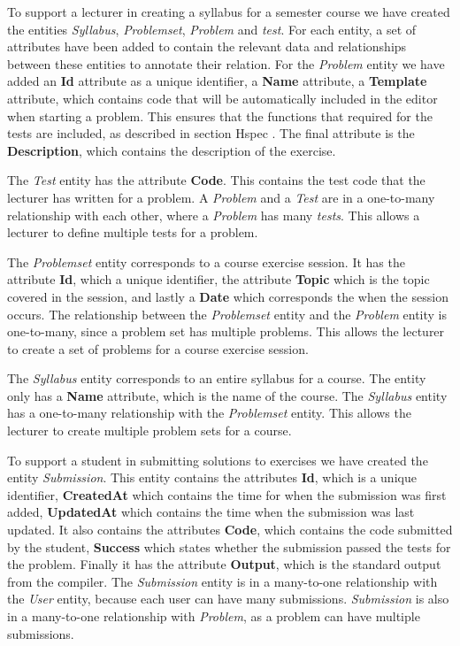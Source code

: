 To support a lecturer in creating a syllabus for a semester course we have created the entities \textit{Syllabus}, \textit{Problemset}, \textit{Problem} and \textit{test}. For each entity, a set of attributes have been added to contain the relevant data and relationships between these entities to annotate their relation.
For the \textit{Problem} entity we have added an \textbf{Id} attribute as a unique identifier, a \textbf{Name} attribute, a \textbf{Template} attribute, which contains code that will be automatically included in the editor when starting a problem. This ensures that the functions that required for the tests are included, as described in section Hspec . The final attribute is the \textbf{Description}, which contains the description of the exercise.

The \textit{Test} entity has the attribute \textbf{Code}. This contains the test code that the lecturer has written for a problem. A \textit{Problem} and a \textit{Test} are in a one-to-many relationship with each other, where a \textit{Problem} has many \textit{tests}. This allows a lecturer to define multiple tests for a problem.

The \textit{Problemset} entity corresponds to a course exercise session. It has the attribute \textbf{Id}, which a unique identifier, the attribute \textbf{Topic} which is the topic covered in the session, and lastly a \textbf{Date} which corresponds the when the session occurs. The relationship between the \textit{Problemset} entity and the \textit{Problem} entity is one-to-many, since a problem set has multiple problems. This allows the lecturer to create a set of problems for a course exercise session.

The \textit{Syllabus} entity corresponds to an entire syllabus for a course. The entity only has a \textbf{Name} attribute, which is the name of the course. The \textit{Syllabus} entity has a one-to-many relationship with the \textit{Problemset} entity. This allows the lecturer to create multiple problem sets for a course.

To support a student in submitting solutions to exercises we have created the entity \textit{Submission}. This entity contains the attributes \textbf{Id}, which is a unique identifier, \textbf{CreatedAt} which contains the time for when the submission was first added, \textbf{UpdatedAt} which contains the time when the submission was last updated. It also contains the attributes \textbf{Code}, which contains the code submitted by the student, \textbf{Success} which states whether the submission passed the tests for the problem. Finally it has the attribute \textbf{Output}, which is the standard output from the compiler.
The \textit{Submission} entity is in a many-to-one relationship with the \textit{User} entity, because each user can have many submissions. \textit{Submission} is also in a many-to-one relationship with \textit{Problem}, as a problem can have multiple submissions.

